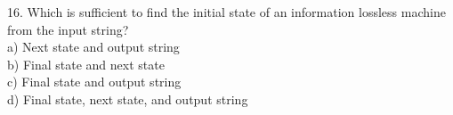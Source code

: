 \documentclass[8pt]{beamer}
\begin{document}
\begin{frame}
\begin{multicols}{2}
\vspace*{0.3cm}
16. Which is sufficient to find the initial state
of an information lossless machine from the
input string?\\
\hspace*{0.4cm} a) Next state and output string\\
\hspace*{0.4cm} b) Final state and next state\\
\hspace*{0.4cm} c) Final state and output string\\
\hspace*{0.4cm} d) Final state, next state, and output string\\



\end{multicols}

\vspace*{0.3cm}
\end{frame}
\end{document}
